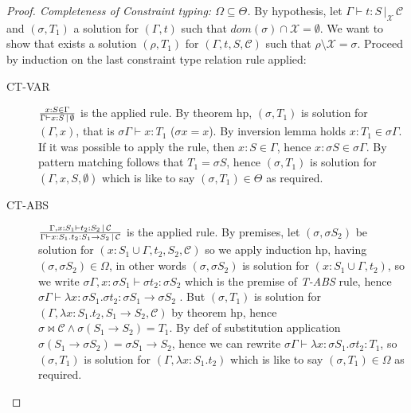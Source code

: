 \documentclass[8pt]{beamer}
\begin{document}
\begin{frame}
    \footnotesize
    \begin{proof}[Proof. Completeness of Constraint typing: 
        $\Omega \subseteq \Theta$]
        By hypothesis, let $\Gamma \vdash t : S \, |_{\mathcal{X}} \,
        \mathcal{C}$  and 
        $(\sigma, T_1)$ a solution for $(\Gamma, t)$ such that 
        $dom(\sigma)\cap\mathcal{X} = \emptyset$. We want to show
        that exists a solution $(\rho, T_1)$ for $(\Gamma, t, S,
        \mathcal{C})$ such that $\rho\setminus\mathcal{X}=\sigma$.
        Proceed by induction on the last constraint type relation rule 
        applied:
        \begin{description}
            \item[CT-VAR] ${{x:S\in\Gamma}\over{\Gamma \vdash x:S
                \,|\,\emptyset}}$ is the applied
                rule. By theorem hp, $(\sigma, T_1)$ is solution for
                $(\Gamma, x)$, that is $\sigma
                \Gamma \vdash x : T_1$ ($\sigma x = x$). By inversion lemma
                holds $x:T_1 \in \sigma\Gamma$. If it was possible to
                apply the rule, then $x:S\in\Gamma$, hence $x:\sigma
                S\in \sigma \Gamma$. By
                pattern matching follows that $T_1 = \sigma S$, hence
                $(\sigma, T_1)$ is solution for
                $(\Gamma,x,S,\emptyset)$ which is like to say
                $(\sigma, T_1)\in\Theta$ as required. 
            \item[CT-ABS] ${{\Gamma, x:S_1\vdash t_2: S_2 
                \,|\,\mathcal{C}}\over{\Gamma \vdash x:S_1.t_2:S_1 
                \rightarrow S_2 \,|\,\mathcal{C}}}$ is the applied 
                rule.  By premises, let $(\sigma, \sigma S_2)$ be 
                solution for $(x:S_1 \cup \Gamma, t_2, S_2, 
                \mathcal{C})$ so we apply induction hp, having 
                $(\sigma, \sigma S_2) \in \Omega$, in other
                words $(\sigma, \sigma S_2)$ is solution for $(x:S_1 
                \cup \Gamma, t_2)$, so we write $\sigma\Gamma,x:\sigma 
                S_1 \vdash \sigma t_2 : \sigma S_2$ which is the 
                premise of \emph{T-ABS} rule, hence $\sigma \Gamma 
                \vdash \lambda x:\sigma S_1.\sigma t_2: \sigma S_1 
                \rightarrow \sigma S_2$
                . But $(\sigma, T_1)$ is solution for
                $(\Gamma, \lambda x:S_1.t_2, S_1\rightarrow S_2, 
                \mathcal{C})$ by theorem hp, hence $\sigma \Join 
                \mathcal{C} \wedge \sigma (S_1 \rightarrow S_2) = 
                T_1$. By def of substitution application $\sigma (S_1 
                \rightarrow \sigma S_2) = \sigma S_1 \rightarrow S_2$, 
                hence
                we can rewrite $\sigma \Gamma \vdash \lambda x:\sigma 
                S_1.\sigma t_2:T_1$, so $(\sigma, T_1)$ is solution 
                for $(\Gamma, \lambda x:S_1.t_2)$  which is like to 
                say $(\sigma, T_1) \in \Omega$ as required.  


\end{description}
\end{proof}
\end{frame}
\end{document}
